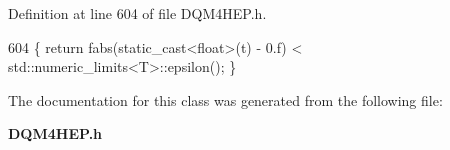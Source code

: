 Definition at line 604 of file D\+Q\+M4\+H\+E\+P.\+h.


\begin{DoxyCode}
604 \{ \textcolor{keywordflow}{return} fabs(static\_cast<float>(t) - 0.f) < std::numeric\_limits<T>::epsilon(); \}
\end{DoxyCode}


The documentation for this class was generated from the following file\+:\begin{DoxyCompactItemize}
\item 
{\bf D\+Q\+M4\+H\+E\+P.\+h}\end{DoxyCompactItemize}
